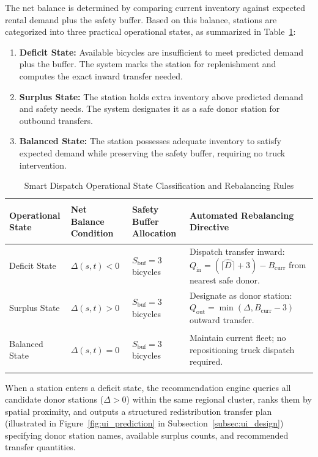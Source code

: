 \documentclass[12pt, a4paper]{article}
\renewcommand{\_}{\textunderscore\allowbreak}
\begin{document}
The net balance is determined by comparing current inventory against expected rental demand plus the safety buffer. Based on this balance, stations are categorized into three practical operational states, as summarized in Table~\ref{tab:rebalance_rules}:
\begin{enumerate}
    \item \textbf{Deficit State:} Available bicycles are insufficient to meet predicted demand plus the buffer. The system marks the station for replenishment and computes the exact inward transfer needed.
    \item \textbf{Surplus State:} The station holds extra inventory above predicted demand and safety needs. The system designates it as a safe donor station for outbound transfers.
    \item \textbf{Balanced State:} The station possesses adequate inventory to satisfy expected demand while preserving the safety buffer, requiring no truck intervention.
\end{enumerate}

\begin{table}[H]
\centering
\small
\renewcommand{\arraystretch}{1.25}
\begin{tabularx}{\textwidth}{|>{\bfseries\raggedright\arraybackslash}p{2.6cm}|>{\centering\arraybackslash}p{2.2cm}|>{\centering\arraybackslash}p{3.2cm}|>{\raggedright\arraybackslash}X|}
\hline
\textbf{Operational State} & \textbf{Net Balance Condition} & \textbf{Safety Buffer Allocation} & \textbf{Automated Rebalancing Directive} \\ \hline
Deficit State & $\Delta(s, t) < 0$ & $S_{\text{buf}} = 3$ bicycles & Dispatch transfer inward: $Q_{\text{in}} = (\lceil \hat{D} \rceil + 3) - B_{\text{curr}}$ from nearest safe donor. \\ \hline
Surplus State & $\Delta(s, t) > 0$ & $S_{\text{buf}} = 3$ bicycles & Designate as donor station: $Q_{\text{out}} = \min(\Delta, B_{\text{curr}} - 3)$ outward transfer. \\ \hline
Balanced State & $\Delta(s, t) = 0$ & $S_{\text{buf}} = 3$ bicycles & Maintain current fleet; no repositioning truck dispatch required. \\ \hline
\end{tabularx}
\caption{Smart Dispatch Operational State Classification and Rebalancing Rules}
\label{tab:rebalance_rules}
\end{table}

When a station enters a deficit state, the recommendation engine queries all candidate donor stations ($\Delta > 0$) within the same regional cluster, ranks them by spatial proximity, and outputs a structured redistribution transfer plan (illustrated in Figure~\ref{fig:ui_prediction} in Subsection~\ref{subsec:ui_design}) specifying donor station names, available surplus counts, and recommended transfer quantities.
\end{document}
